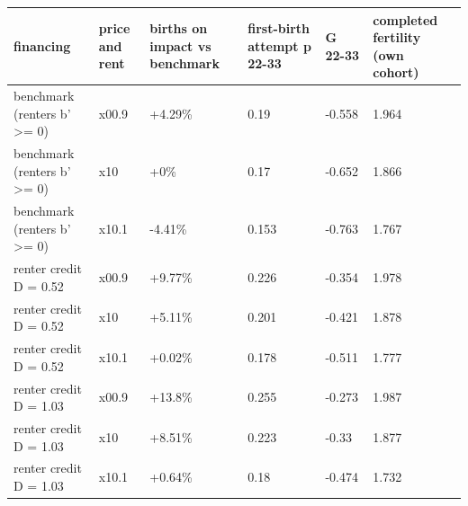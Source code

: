 \begingroup\small
\setlength{\tabcolsep}{3pt}
\renewcommand{\arraystretch}{1.04}
\begin{tabularx}{\linewidth}{XXXXXX}
\toprule
financing & price and rent & births on impact vs benchmark & first-birth attempt p 22-33 & G 22-33 & completed fertility (own cohort) \\
\midrule
benchmark (renters b' \textgreater{}= 0) & x00.9 & +4.29\% & 0.19 & -0.558 & 1.964 \\
benchmark (renters b' \textgreater{}= 0) & x10 & +0\% & 0.17 & -0.652 & 1.866 \\
benchmark (renters b' \textgreater{}= 0) & x10.1 & -4.41\% & 0.153 & -0.763 & 1.767 \\
renter credit D = 0.52 & x00.9 & +9.77\% & 0.226 & -0.354 & 1.978 \\
renter credit D = 0.52 & x10 & +5.11\% & 0.201 & -0.421 & 1.878 \\
renter credit D = 0.52 & x10.1 & +0.02\% & 0.178 & -0.511 & 1.777 \\
renter credit D = 1.03 & x00.9 & +13.8\% & 0.255 & -0.273 & 1.987 \\
renter credit D = 1.03 & x10 & +8.51\% & 0.223 & -0.33 & 1.877 \\
renter credit D = 1.03 & x10.1 & +0.64\% & 0.18 & -0.474 & 1.732 \\
\bottomrule
\end{tabularx}
\endgroup
